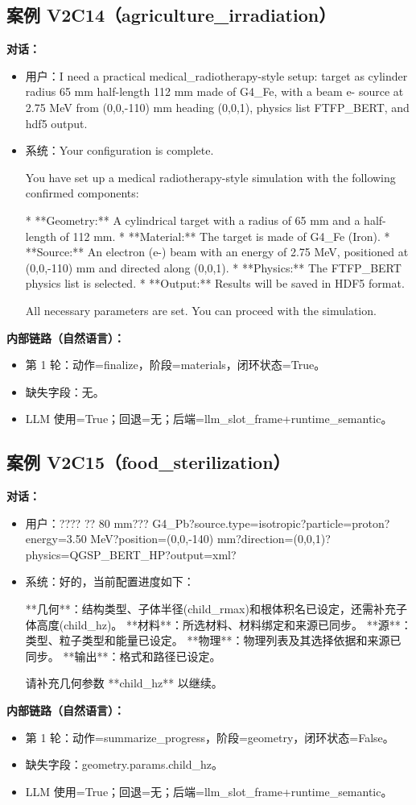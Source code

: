 \documentclass[11pt]{ctexart}
\begin{document}
\subsection{案例 V2C14（agriculture\_irradiation）}
\textbf{对话：}
\begin{itemize}
\item 用户：I need a practical medical\_radiotherapy-style setup: target as cylinder radius 65 mm half-length 112 mm made of G4\_Fe, with a beam e- source at 2.75 MeV from (0,0,-110) mm heading (0,0,1), physics list FTFP\_BERT, and hdf5 output.
\item 系统：Your configuration is complete.

You have set up a medical radiotherapy-style simulation with the following confirmed components:

*   **Geometry:** A cylindrical target with a radius of 65 mm and a half-length of 112 mm.
*   **Material:** The target is made of G4\_Fe (Iron).
*   **Source:** An electron (e-) beam with an energy of 2.75 MeV, positioned at (0,0,-110) mm and directed along (0,0,1).
*   **Physics:** The FTFP\_BERT physics list is selected.
*   **Output:** Results will be saved in HDF5 format.

All necessary parameters are set. You can proceed with the simulation.
\end{itemize}
\textbf{内部链路（自然语言）：}
\begin{itemize}
\item 第 1 轮：动作=finalize，阶段=materials，闭环状态=True。
\item 缺失字段：无。
\item LLM 使用=True；回退=无；后端=llm\_slot\_frame+runtime\_semantic。
\end{itemize}
\subsection{案例 V2C15（food\_sterilization）}
\textbf{对话：}
\begin{itemize}
\item 用户：???? ?? 80 mm??? G4\_Pb?source.type=isotropic?particle=proton?energy=3.50 MeV?position=(0,0,-140) mm?direction=(0,0,1)?physics=QGSP\_BERT\_HP?output=xml?
\item 系统：好的，当前配置进度如下：

**几何**：结构类型、子体半径(child\_rmax)和根体积名已设定，还需补充子体高度(child\_hz)。
**材料**：所选材料、材料绑定和来源已同步。
**源**：类型、粒子类型和能量已设定。
**物理**：物理列表及其选择依据和来源已同步。
**输出**：格式和路径已设定。

请补充几何参数 **child\_hz** 以继续。
\end{itemize}
\textbf{内部链路（自然语言）：}
\begin{itemize}
\item 第 1 轮：动作=summarize\_progress，阶段=geometry，闭环状态=False。
\item 缺失字段：geometry.params.child\_hz。
\item LLM 使用=True；回退=无；后端=llm\_slot\_frame+runtime\_semantic。
\end{itemize}
\end{document}
